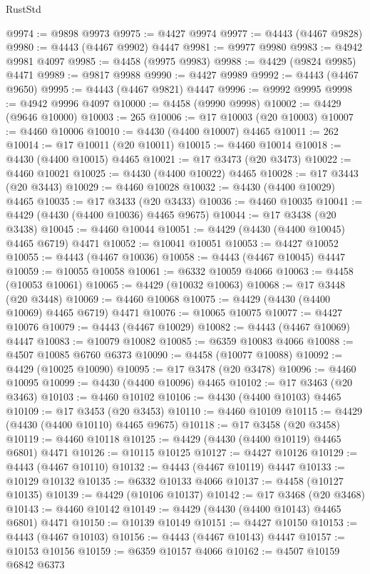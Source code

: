 \begin{lexlean}{RustStd}
\begin{coremodule}
{\begin{coremodule}
{{{{{{{{{{{{{{{{{{{{{{{{{{{{{{{{{{{{{{{{{{{{{{{{{{{{{{{{{{{{{{{{{{{{@9974 := @9898 @9973
@9975 := @4427 @9974
@9977 := @4443 (@4467 @9828)
@9980 := @4443 (@4467 @9902) @4447
@9981 := @9977 @9980
@9983 := @4942 @9981 @4097
@9985 := @4458 (@9975 @9983)
@9988 := @4429 (@9824 @9985) @4471
@9989 := @9817 @9988
@9990 := @4427 @9989
@9992 := @4443 (@4467 @9650)
@9995 := @4443 (@4467 @9821) @4447
@9996 := @9992 @9995
@9998 := @4942 @9996 @4097
@10000 := @4458 (@9990 @9998)
@10002 := @4429 (@9646 @10000)
@10003 := 265
@10006 := @17 @10003 (@20 @10003)
@10007 := @4460 @10006
@10010 := @4430 (@4400 @10007) @4465
@10011 := 262
@10014 := @17 @10011 (@20 @10011)
@10015 := @4460 @10014
@10018 := @4430 (@4400 @10015) @4465
@10021 := @17 @3473 (@20 @3473)
@10022 := @4460 @10021
@10025 := @4430 (@4400 @10022) @4465
@10028 := @17 @3443 (@20 @3443)
@10029 := @4460 @10028
@10032 := @4430 (@4400 @10029) @4465
@10035 := @17 @3433 (@20 @3433)
@10036 := @4460 @10035
@10041 := @4429 (@4430 (@4400 @10036) @4465 @9675)
@10044 := @17 @3438 (@20 @3438)
@10045 := @4460 @10044
@10051 := @4429 (@4430 (@4400 @10045) @4465 @6719) @4471
@10052 := @10041 @10051
@10053 := @4427 @10052
@10055 := @4443 (@4467 @10036)
@10058 := @4443 (@4467 @10045) @4447
@10059 := @10055 @10058
@10061 := @6332 @10059 @4066
@10063 := @4458 (@10053 @10061)
@10065 := @4429 (@10032 @10063)
@10068 := @17 @3448 (@20 @3448)
@10069 := @4460 @10068
@10075 := @4429 (@4430 (@4400 @10069) @4465 @6719) @4471
@10076 := @10065 @10075
@10077 := @4427 @10076
@10079 := @4443 (@4467 @10029)
@10082 := @4443 (@4467 @10069) @4447
@10083 := @10079 @10082
@10085 := @6359 @10083 @4066
@10088 := @4507 @10085 @6760 @6373
@10090 := @4458 (@10077 @10088)
@10092 := @4429 (@10025 @10090)
@10095 := @17 @3478 (@20 @3478)
@10096 := @4460 @10095
@10099 := @4430 (@4400 @10096) @4465
@10102 := @17 @3463 (@20 @3463)
@10103 := @4460 @10102
@10106 := @4430 (@4400 @10103) @4465
@10109 := @17 @3453 (@20 @3453)
@10110 := @4460 @10109
@10115 := @4429 (@4430 (@4400 @10110) @4465 @9675)
@10118 := @17 @3458 (@20 @3458)
@10119 := @4460 @10118
@10125 := @4429 (@4430 (@4400 @10119) @4465 @6801) @4471
@10126 := @10115 @10125
@10127 := @4427 @10126
@10129 := @4443 (@4467 @10110)
@10132 := @4443 (@4467 @10119) @4447
@10133 := @10129 @10132
@10135 := @6332 @10133 @4066
@10137 := @4458 (@10127 @10135)
@10139 := @4429 (@10106 @10137)
@10142 := @17 @3468 (@20 @3468)
@10143 := @4460 @10142
@10149 := @4429 (@4430 (@4400 @10143) @4465 @6801) @4471
@10150 := @10139 @10149
@10151 := @4427 @10150
@10153 := @4443 (@4467 @10103)
@10156 := @4443 (@4467 @10143) @4447
@10157 := @10153 @10156
@10159 := @6359 @10157 @4066
@10162 := @4507 @10159 @6842 @6373
}}}}}}}}}}}}}}}}}}}}}}}}}}}}}}}}}}}}}}}}}}}}}}}}}}}}}}}}}}}}}}}}}}}}
\end{coremodule}}
\end{coremodule}
\end{lexlean}
